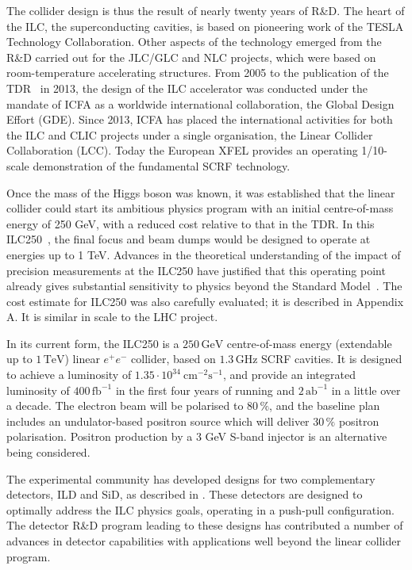 \documentclass[%
reprint,
 floatfix,
 amsmath,amssymb,
 aps,
]{revtex4-1}
\begin{document}
The collider design is thus the result of nearly twenty years of
R\&D. The heart of the ILC, the superconducting cavities, is based on
pioneering work of the TESLA Technology Collaboration. Other aspects of the 
technology
emerged from the R\&D carried out for the JLC/GLC and NLC projects,
which were based on room-temperature accelerating structures. From
2005 to the publication of the TDR~\cite{Behnke:2013xla} in 2013, the
design of the ILC accelerator was conducted under the mandate of ICFA
as a worldwide
international collaboration, the Global Design Effort (GDE). 
Since 2013, ICFA has placed the  international activities for both the ILC and CLIC
projects under a single organisation, 
the Linear Collider Collaboration (LCC).
Today the European XFEL provides an operating 1/10-scale demonstration of the fundamental SCRF technology.


Once the mass of the Higgs boson was known, it was established that the
linear collider could start its ambitious physics program with an initial centre-of-mass energy of 250 GeV, with a reduced cost relative to that in the TDR.  In this ILC250~\cite{Evans:2017rvt}, the final focus and beam dumps would be designed to operate at energies up to 1 TeV.
Advances in the theoretical understanding of the impact of precision
measurements at the 
 ILC250 have justified that this operating point already gives
 substantial 
sensitivity to physics beyond the Standard 
Model~\cite{Barklow:2017suo,Fujii:2017vwa}. 
 The cost estimate for ILC250 was also carefully evaluated;
it is described in Appendix A. It is similar in scale to the
LHC 
project.


In its current
form, the ILC250 is a $250\,{\mathrm{GeV}}$ centre-of-mass energy
(extendable up to $1\,{\mathrm{TeV}}$) linear $e^+e^-$ collider, based
on $1.3\,{\mathrm{GHz}}$  SCRF
cavities. It is designed to achieve a luminosity of $1.35\cdot
10^{34}~{\mathrm{cm}}^{-2}{\mathrm{s}}^{-1}$, and provide an integrated
luminosity of $400\,{\mathrm{fb}}^{-1}$ in the first four years of
running and $2\,{\mathrm{ab}}^{-1}$ in a little over a decade. The electron beam will be polarised to $80\,\%$, and the baseline plan includes an 
undulator-based
positron source which will  deliver
$30\,\%$ positron  polarisation. 
Positron production by a 3 GeV S-band injector
is an alternative being considered.


The experimental community has developed
designs for two complementary detectors, ILD and SiD, 
as described in \cite{Behnke:2013lya}. These detectors are designed to 
optimally address the
ILC physics goals, operating in a push-pull configuration.  
The detector R\&D program leading to these designs
has 
contributed a number of advances in 
detector capabilities with applications well beyond the linear
collider program. 
\end{document}
